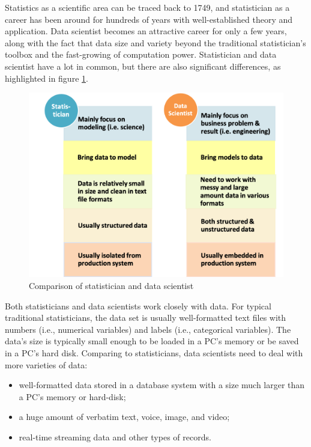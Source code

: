 \documentclass[
  12pt,
]{krantz}
\providecommand{\tightlist}{%
  \setlength{\itemsep}{0pt}\setlength{\parskip}{0pt}}
\begin{document}
Statistics as a scientific area can be traced back to 1749, and statistician as a career has been around for hundreds of years with well-established theory and application. Data scientist becomes an attractive career for only a few years, along with the fact that data size and variety beyond the traditional statistician's toolbox and the fast-growing of computation power. Statistician and data scientist have a lot in common, but there are also significant differences, as highlighted in figure \ref{fig:softskill1}.

\begin{figure}

{\centering \includegraphics[width=0.8\linewidth]{images/softskill1} 

}

\caption{Comparison of statistician and data scientist}\label{fig:softskill1}
\end{figure}

Both statisticians and data scientists work closely with data. For typical traditional statisticians, the data set is usually well-formatted text files with numbers (i.e., numerical variables) and labels (i.e., categorical variables). The data's size is typically small enough to be loaded in a PC's memory or be saved in a PC's hard disk. Comparing to statisticians, data scientists need to deal with more varieties of data:

\begin{itemize}
\tightlist
\item
  well-formatted data stored in a database system with a size much larger than a PC's memory or hard-disk;
\item
  a huge amount of verbatim text, voice, image, and video;
\item
  real-time streaming data and other types of records.
\end{itemize}
\end{document}
